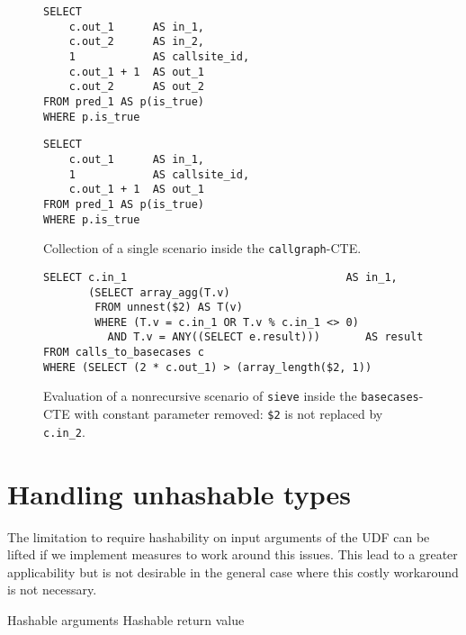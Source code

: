 \begin{figure}[h]
    \centering
    \begin{minipage}[b]{.45\linewidth}
    \centering
    \begin{verbatim}
SELECT
    c.out_1      AS in_1, 
    c.out_2      AS in_2, 
    1            AS callsite_id,
    c.out_1 + 1  AS out_1
    c.out_2      AS out_2
FROM pred_1 AS p(is_true)
WHERE p.is_true
    \end{verbatim}
    \label{}
    \end{minipage}
    \hfill
    \begin{minipage}[b]{.45\linewidth}
    \centering
    \begin{verbatim}
SELECT
    c.out_1      AS in_1, 
    1            AS callsite_id,
    c.out_1 + 1  AS out_1
FROM pred_1 AS p(is_true)
WHERE p.is_true
    \end{verbatim}
    \label{}
    \end{minipage}
    \caption{Collection of a single scenario inside the \texttt{callgraph}-CTE.}
    \label{}
\end{figure}

\begin{figure}
    \centering
    \begin{verbatim}
SELECT c.in_1                                  AS in_1, 
       (SELECT array_agg(T.v)
        FROM unnest($2) AS T(v)
        WHERE (T.v = c.in_1 OR T.v % c.in_1 <> 0)
          AND T.v = ANY((SELECT e.result)))       AS result
FROM calls_to_basecases c
WHERE (SELECT (2 * c.out_1) > (array_length($2, 1))
    \end{verbatim}
    \caption{Evaluation of a nonrecursive scenario of \texttt{sieve} inside the \texttt{basecases}-CTE with constant parameter removed: \texttt{\$2} is not replaced by \texttt{c.in\_2}.}
    \label{fig:my_label}
\end{figure}

\section{Handling unhashable types}
The limitation to require hashability on input arguments of the UDF can be lifted if we implement measures to work around this issues. This lead to a greater applicability but is not desirable in the general case where this costly workaround is not necessary.


Hashable arguments
Hashable return value